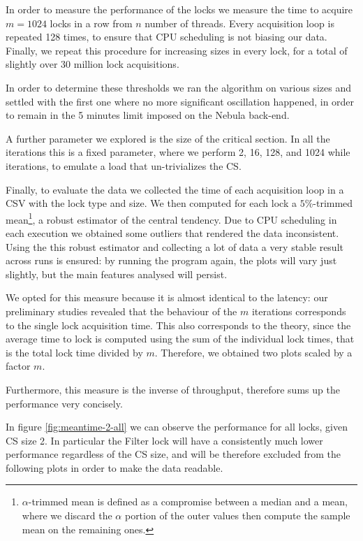 In order to measure the performance of the locks we measure the time to acquire
$m = 1024$ locks in a row from $n$ number of threads.
Every acquisition loop is repeated 128 times, to ensure that CPU scheduling is not
biasing our data.
Finally, we repeat this procedure for increasing sizes in every lock, for a total
of slightly over 30 million lock acquisitions.

In order to determine these thresholds we ran the algorithm on various sizes and
settled with the first one where no more significant oscillation happened,
in order to remain in the 5 minutes limit imposed on the Nebula back-end.

A further parameter we explored is the size of the critical section.
In all the iterations this is a fixed parameter, where we perform 2, 16, 128,
and 1024 while iterations, to emulate a load that un-trivializes the CS.

Finally, to evaluate the data we collected the time of each acquisition loop in
a CSV with the lock type and size.
We then computed for each lock a $5\%$-trimmed mean\footnote{$\alpha$-trimmed
mean is defined as a compromise between a median and a mean, where we discard
the $\alpha$ portion of the outer values then compute the sample mean on the
remaining ones.}, a robust estimator of the
central tendency.
Due to CPU scheduling in each execution we obtained some outliers that rendered
the data inconsistent.
Using the this robust estimator and collecting a lot of data a very stable
result across runs is ensured: by running the program again, the plots will vary
just slightly, but the main features analysed will persist.

We opted for this measure because it is almost identical to the latency: our
preliminary studies revealed that the behaviour of the $m$ iterations corresponds
to the single lock acquisition time.
This also corresponds to the theory, since the average time to lock is computed
using the sum of the individual lock times, that is the total lock time divided
by $m$.
Therefore, we obtained two plots scaled by a factor $m$.

Furthermore, this measure is the inverse of throughput, therefore sums up the
performance very concisely.

In figure \ref{fig:meantime-2-all} we can observe the performance for all locks,
given CS size 2.
In particular the Filter lock will have a consistently much lower performance
regardless of the CS size, and will be therefore excluded from the following
plots in order to make the data readable.

